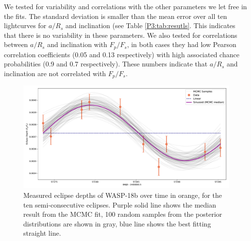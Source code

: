 We tested for variability and correlations with the other parameters we let free in the fits. The standard deviation is smaller than the mean error over all ten lightcurves for $a/R_s$ and inclination (see Table \ref{P3:tab:resutls}. This indicates that there is no variability in these parameters. We also tested for correlations between $a/R_s$ and inclination with $F_p/F_s$, in both cases they had low Pearson correlation coefficients (0.05 and 0.13 respectively) with high associated chance probabilities (0.9 and 0.7 respectively). These numbers indicate that $a/R_s$ and inclination are not correlated with $F_p/F_s$.





\begin{figure}
    \centering
    \includegraphics[width=\linewidth]{MCMCvarsamples.pdf}
    \caption{Measured eclipse depths of WASP-18b over time in orange, for the ten semi-consecutive eclipses. Purple solid line shows the median result from the MCMC fit, 100 random samples from the posterior distributions are shown in gray, blue line shows the best fitting straight line.}
    \label{P3:fig:variability}
\end{figure}

